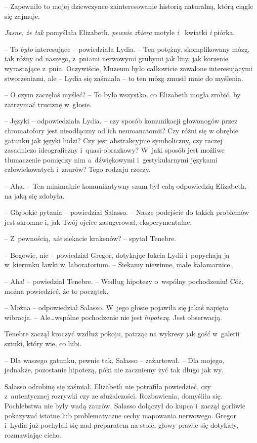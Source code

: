 \documentclass[oneside,polish,12pt,sfheadings]{mwbk}
\begin{document}
-- Zapewniło to mojej
dziewczynce zainteresowanie historią naturalną, którą ciągle się
zajmuje.

\emph{Jasne, że tak} pomyślała Elizabeth. \emph{pewnie zbiera } motyle
\emph{ i~} kwiatki \emph{i } piórka.

-- To \emph{było } interesujące -- powiedziała Lydia. -- Ten potężny,
skomplikowany mózg, tak różny od naszego, z~pniami nerwowymi grubymi jak
liny, jak korzenie wyrastające z~pnia. Oczywiście, Muzeum było
całkowicie zawalone interesującymi stworzeniami, ale -- Lydia się
zaśmiała -- to ten mózg zmusił mnie do myślenia.

-- O czym zaczęłaś myśleć? -- To było wszystko, co Elizabeth mogła zrobić,
by zatrzymać truciznę w~głosie.

-- Języki -- odpowiedziała Lydia. -- czy sposób komunikacji głowonogów
przez chromatofory jest nieodłączny od ich neuroanatomii? Czy różni się
w obrębie gatunku jak języki ludzi? Czy jest abstrakcyjnie symboliczny,
czy raczej zasadniczo ideograficzny i~quasi-obrazkowy? W~jaki sposób
jest możliwe tłumaczenie pomiędzy nim a~dźwiękowymi i~gestykularnymi
językami człowiekowatych i~zaurów? Tego rodzaju rzeczy.

-- Aha. -- Ten minimalnie komunikatywny szum był całą odpowiedzią
Elizabeth, na jaką się zdobyła.

-- Głębokie pytania -- powiedział Salasso. -- Nasze podejście do takich
problemów jest skromne i, jak Twój ojciec zasugerował, eksperymentalne.

-- Z~pewnością, \emph{nie} siekacie krakenów? -- spytał Tenebre.

-- Bogowie, nie -- powiedział Gregor, dotykając łokcia Lydii i~popychają
ją w~kierunku ławki w~laboratorium. -- Siekamy niewinne, małe
kałamarnice.

-- Aha! -- powiedział Tenebre. -- Według hipotezy o~wspólny pochodzeniu!
Cóż, można powiedzieć, że to początek.

-- Można -- odpowiedział Salasso. W~jego głosie pojawiła się jakaś napięta
wibracja. -- Ale\ldots wspólne pochodzenie nie jest \emph{hipotezą. } Jest
obserwacją.

Tenebre zaczął kroczyć wzdłuż pokoju, patrząc na wykresy jak gość w~galerii sztuki, który wie, co lubi.

-- Dla waszego gatunku, pewnie tak, Salasso -- zażartował. -- Dla mojego,
jednakże, pozostanie hipotezą, póki nie zaczniemy żyć tak długo jak wy.

Salasso odrobinę się zaśmiał, Elizabeth nie potrafiła powiedzieć, czy z~autentycznej rozrywki czy ze służalczości. Rozbawienia, domyśliła się.
Pochlebstwa nie były wadą zaurów. Salasso dołączył do kupca i~zaczął
gorliwie pokazywać istotne lub problematyczne cechy mapowania nerwowego.
Gregor i~Lydia już pochylali się nad preparatem na stole, głowy prawie
się dotykały, rozmawiając cicho.
\end{document}
